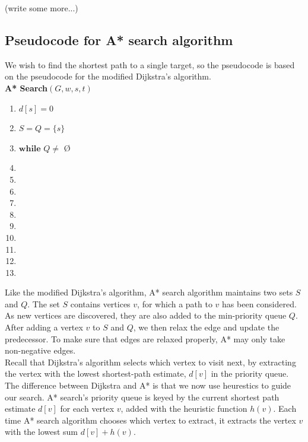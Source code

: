 \documentclass[11pt]{article}
\begin{document}
\noindent(write some more...)\\


\subsection{Pseudocode for A* search algorithm}
We wish to find the shortest path to a single target, so the pseudocode is based on the pseudocode for the modified Dijkstra's algorithm.\\

\textbf{A* Search$(G, w, s, t)$}
\begin{enumerate}
\setlength\itemsep{0em}
\item $d[s] = 0$
\item $S = Q = \{s\}$
\item $\textbf{while } Q \neq  $ \O
\item {}
\item {}
\item \tab{}
\item {}
\item \tab{}
\item \tab{}\tab{}
\item \tab{}\tab{}
\item \tab{}\tab{}
\item \tab{}\tab{}
\item \tab{}\tab{}
\end{enumerate}
Like the modified Dijkstra's algorithm, A* search algorithm maintains two sets $S$ and $Q$. The set $S$ contains vertices $v$, for which a path to $v$ has been considered. As new vertices are discovered, they are also added to the min-priority queue $Q$. After adding a vertex $v$ to $S$ and $Q$, we then relax the edge and update the predecessor. To make sure that edges are relaxed properly, A* may only take non-negative edges.\\

\noindent Recall that Dijkstra's algorithm selects which vertex to visit next, by extracting the vertex with the lowest shortest-path estimate, $d[v]$ in the priority queue. The difference between Dijkstra and A* is that we now use heurestics to guide our search. A* search's priority queue is keyed by the current shortest path estimate $d[v]$ for each vertex $v$, added with the heuristic function $h(v)$. Each time A* search algorithm chooses which vertex to extract, it extracts the vertex $v$ with the lowest sum $d[v]+h(v)$.\\
\end{document}
